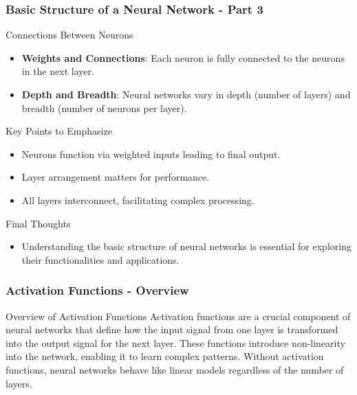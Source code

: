 \documentclass[aspectratio=169]{beamer}
\begin{document}
\begin{frame}[fragile]
    \frametitle{Basic Structure of a Neural Network - Part 3}
    \begin{block}{Connections Between Neurons}
        \begin{itemize}
            \item \textbf{Weights and Connections}: Each neuron is fully connected to the neurons in the next layer.
            \item \textbf{Depth and Breadth}: Neural networks vary in depth (number of layers) and breadth (number of neurons per layer).
        \end{itemize}
    \end{block}

    \begin{block}{Key Points to Emphasize}
        \begin{itemize}
            \item Neurons function via weighted inputs leading to final output.
            \item Layer arrangement matters for performance.
            \item All layers interconnect, facilitating complex processing.
        \end{itemize}
    \end{block}

    \begin{block}{Final Thoughts}
        \begin{itemize}
            \item Understanding the basic structure of neural networks is essential for exploring their functionalities and applications.
        \end{itemize}
    \end{block}
\end{frame}

\begin{frame}[fragile]
    \frametitle{Activation Functions - Overview}
    \begin{block}{Overview of Activation Functions}
        Activation functions are a crucial component of neural networks that define how the input signal from one layer is transformed into the output signal for the next layer. 
        These functions introduce non-linearity into the network, enabling it to learn complex patterns.
        Without activation functions, neural networks behave like linear models regardless of the number of layers.
    \end{block}
\end{frame}
\end{document}

